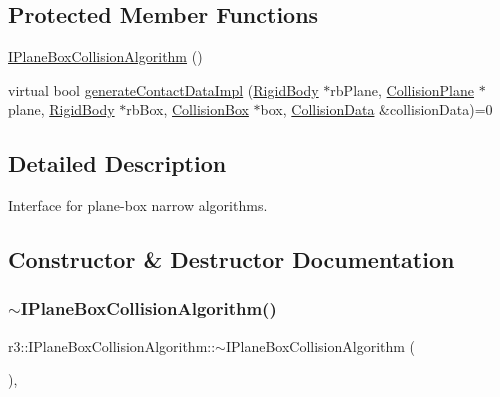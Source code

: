 \subsection*{Protected Member Functions}
\begin{DoxyCompactItemize}
\item 
\mbox{\hyperlink{classr3_1_1_i_plane_box_collision_algorithm_a73cced571b18b06ac13e67d7bae5f10a}{I\+Plane\+Box\+Collision\+Algorithm}} ()
\item 
virtual bool \mbox{\hyperlink{classr3_1_1_i_plane_box_collision_algorithm_a48f6ca7613a0cc7c64d8e0cfe34674e8}{generate\+Contact\+Data\+Impl}} (\mbox{\hyperlink{classr3_1_1_rigid_body}{Rigid\+Body}} $\ast$rb\+Plane, \mbox{\hyperlink{classr3_1_1_collision_plane}{Collision\+Plane}} $\ast$plane, \mbox{\hyperlink{classr3_1_1_rigid_body}{Rigid\+Body}} $\ast$rb\+Box, \mbox{\hyperlink{classr3_1_1_collision_box}{Collision\+Box}} $\ast$box, \mbox{\hyperlink{classr3_1_1_collision_data}{Collision\+Data}} \&collision\+Data)=0
\end{DoxyCompactItemize}


\subsection{Detailed Description}
Interface for plane-\/box narrow algorithms. 

\subsection{Constructor \& Destructor Documentation}
\mbox{\label{classr3_1_1_i_plane_box_collision_algorithm_a1a1d1348a9e42970cfa770fa6017d4ed}} 
\subsubsection{\texorpdfstring{$\sim$\+I\+Plane\+Box\+Collision\+Algorithm()}{~IPlaneBoxCollisionAlgorithm()}}
{\footnotesize\ttfamily r3\+::\+I\+Plane\+Box\+Collision\+Algorithm\+::$\sim$\+I\+Plane\+Box\+Collision\+Algorithm (\begin{DoxyParamCaption}{ }\end{DoxyParamCaption})\hspace{0.3cm}{\ttfamily [virtual]}, {\ttfamily [default]}}

